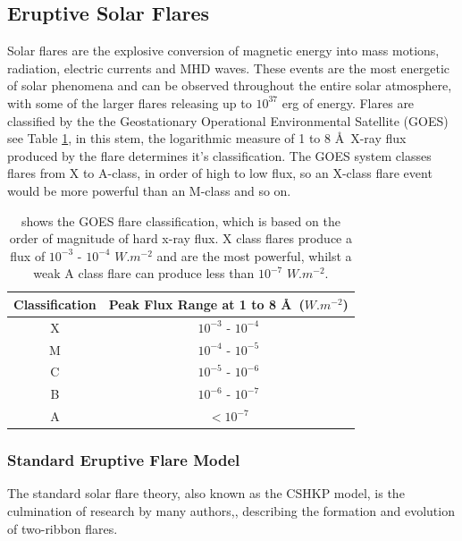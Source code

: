 


\subsection{Eruptive Solar Flares}\label{flares}

Solar flares are the explosive conversion of magnetic energy into mass motions, radiation, electric currents and MHD waves. These events are the most energetic of solar phenomena and can be observed throughout the entire solar atmosphere, with some of the larger flares releasing up to $10^{37}$ erg of energy. Flares are classified by the the Geostationary Operational Environmental Satellite (GOES) see Table \ref{goes}, in this stem, the logarithmic measure of 1 to 8 \AA\ X-ray flux produced by the flare determines it's classification. The GOES system classes flares from X to A-class, in order of high to low flux, so an X-class flare event would be more powerful than an M-class and so on. \\

\begin{table}[h]
\centering
\begin{tabular}{|c|c|}\label{GOES}
Classification & Peak Flux Range at 1 to 8 \AA\ ($W.m^{-2}$) \\
\hline
X & $10^{-3}$ - $10^{-4}$\\
M & $10^{-4}$ - $10^{-5}$\\
C & $10^{-5}$ - $10^{-6}$\\
B & $10^{-6}$ - $10^{-7}$\\
A & $<10^{-7}$\\
\end{tabular}
\caption{shows the GOES flare classification, which is based on the order of magnitude of hard x-ray flux. X class flares produce a flux of $10^{-3}$ - $10^{-4}$ $W.m^{-2}$ and are the most powerful, whilst a weak A class flare can produce less than $10^{-7}$ $W.m^{-2}$.}\label{goes}
\end{table}

\subsubsection{Standard Eruptive Flare Model}
The standard solar flare theory, also known as the CSHKP model, is the culmination of research by many authors,\citep{1964NASSP..50..451C, 1966Natur.211..695S, 1974SoPh...34..323H, 1976SoPh...50...85K}, describing the formation and evolution of two-ribbon flares. 

